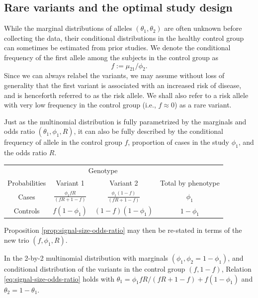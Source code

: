 \subsection{Rare variants and the optimal study design}
\label{subsec:optimal-design} 

While the marginal distributions of alleles $(\theta_1, \theta_2)$ are often unknown before collecting the data, their conditional distributions in the healthy control group can sometimes be estimated from prior studies.
We denote the conditional frequency of the first allele among the subjects in the control group as
$$
f := \mu_{21} / \phi_2.
$$
Since we can always relabel the variants, we may assume without loss of generality that the first variant is associated with an increased risk of disease, and is henceforth referred to as the risk allele.
We shall also refer to a risk allele with very low frequency in the control group (i.e., $f\approx 0$) as a rare variant.

Just as the multinomial distribution is fully parametrized by the marginals and odds ratio  $(\theta_1, \phi_1, R)$, it can also be fully described by the conditional frequency of allele in the control group $f$, proportion of cases in the study $\phi_1$, and the odds ratio $R$.

\begin{center}
    \begin{tabular}{cccc}
    \hline
    & \multicolumn{2}{c}{Genotype} \\
    \cline{2-3}
    Probabilities & Variant 1 & Variant 2 & Total by phenotype \\
    \hline
    Cases & $\frac{\phi_1fR}{(fR+1-f)}$ & $\frac{\phi_1(1-f)}{(fR+1-f)}$ & $\phi_1$ \\
    Controls & $f(1-\phi_1)$ & $(1-f)(1-\phi_1)$ & $1-\phi_1$ \\
    \hline
    \end{tabular}
\end{center}

Proposition \ref{prop:signal-size-odds-ratio} may then be re-stated in terms of the new trio $(f, \phi_1, R)$.


\begin{corollary} \label{cor:signal-size-odds-ratio-conditional-frequency}
In the 2-by-2 multinomial distribution with marginals $(\phi_1, \phi_2 = 1-\phi_1)$, and conditional distribution of the variants in the control group $(f, 1-f)$,
Relation \eqref{eq:signal-size-odds-ratio} holds with $\theta_1 = {\phi_1fR}/{(fR+1-f)} + f(1-\phi_1)$ and $\theta_2 = 1-\theta_1$.
\end{corollary} 

